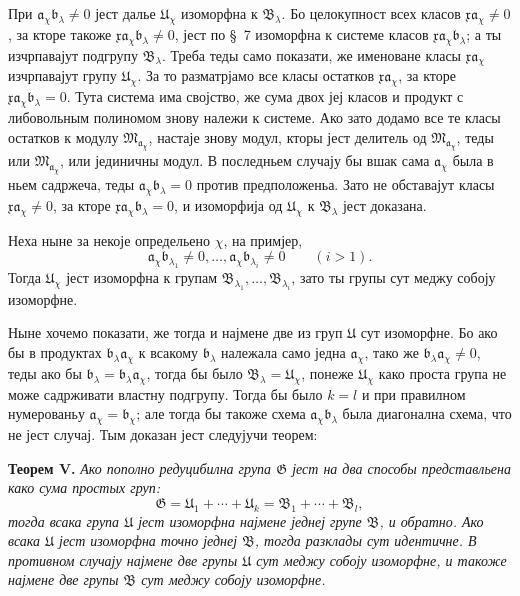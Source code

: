 ﻿\documentclass[11pt]{article}
\providecommand{\mM}{\mathfrak M}
\providecommand{\mG}{\mathfrak G}
\providecommand{\mU}{\mathfrak U}
\providecommand{\mB}{\mathfrak B}
\providecommand{\ma}{\mathfrak a}
\providecommand{\mb}{\mathfrak b}
\providecommand{\mx}{\mathfrak x}
\begin{document}
При \(\ma_\chi\mb_\lambda\ne0\) јест далье \(\mU_\chi\) изоморфна к \(\mB_\lambda\). Бо целокупност всех класов \(\mx\ma_\chi\ne0\), за кторе такоже \(\mx\ma_\chi\mb_\lambda\ne0\), јест по \S~7 изоморфна к системе класов \(\mx\ma_\chi\mb_\lambda\); а ты изчрпавајут подгрупу \(\mB_\lambda\). Треба теды само показати, же именоване класы \(\mx\ma_\chi\) изчрпавајут групу \(\mU_\chi\). За то разматрјамо все класы остатков \(\mx\ma_\chi\), за кторе \(\mx\ma_\chi\mb_\lambda=0\). Тута система има својство, же сума двох јеј класов и продукт с либовольным полиномом знову належи к системе. Ако зато додамо все те класы остатков к модулу \(\mM_{\ma_\chi}\), настаје знову модул, кторы јест делитель од \(\mM_{\ma_\chi}\), теды или \(\mM_{\ma_\chi}\), или јединичны модул. В последньем случају бы вшак сама \(\ma_\chi\) была в ньем садржеча, теды \(\ma_\chi\mb_\lambda=0\) против предположеньа. Зато не обставајут класы \(\mx\ma_\chi\ne0\), за кторе \(\mx\ma_\chi\mb_\lambda=0\), и изоморфија од \(\mU_\chi\) к \(\mB_\lambda\) јест доказана.

Неха ныне за некоје определьено \(\chi\), на примјер,
\[
 \ma_\chi\mb_{\lambda_1}\ne0,
 \ldots,\ma_\chi\mb_{\lambda_i}\ne0\qquad(i>1).
\]
Тогда \(\mU_\chi\) јест изоморфна к групам \(\mB_{\lambda_1},\ldots,\mB_{\lambda_i}\), зато ты групы сут меджу собоју изоморфне.

Ныне хочемо показати, же тогда и најмене две из груп \(\mU\) сут изоморфне. Бо ако бы в продуктах \(\mb_\lambda\ma_\chi\) к всакому \(\mb_\lambda\) належала само једна \(\ma_\chi\), тако же \(\mb_\lambda\ma_\chi\ne0\), теды ако бы \(\mb_\lambda=\mb_\lambda\ma_\chi\), тогда бы было \(\mB_\lambda=\mU_\chi\), понеже \(\mU_\chi\) како проста група не може садрживати властну подгрупу. Тогда бы было \(k=l\) и при правилном нумерованьу \(\ma_\chi=\mb_\chi\); але тогда бы такоже схема \(\ma_\chi\mb_\lambda\) была диагонална схема, что не јест случај. Тым доказан јест следујучи теорем:

\textbf{Теорем V.} \textit{Ако пополно редуцибилна група \(\mG\) јест на два способы представльена како сума простых груп:
\[
 \mG=\mU_1+\cdots+\mU_k=\mB_1+\cdots+\mB_l,
\]
тогда всака група \(\mU\) јест изоморфна најмене једнеј групе \(\mB\), и обратно. Ако всака \(\mU\) јест изоморфна точно једнеј \(\mB\), тогда разклады сут идентичне. В противном случају најмене две групы \(\mU\) сут меджу собоју изоморфне, и такоже најмене две групы \(\mB\) сут меджу собоју изоморфне.}
\end{document}
